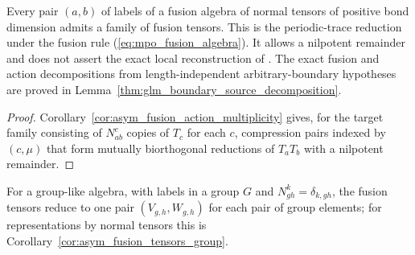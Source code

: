 \begin{theorem}%
    \label{thm:mpoalg_fusion_tensors_exist}
    \leanok
    Every pair $(a,b)$ of labels of a fusion algebra of normal tensors of
    positive bond dimension admits a family of fusion tensors. This is the
    periodic-trace reduction under the fusion rule
    (\ref{eq:mpo_fusion_algebra}). It allows a nilpotent remainder and
    does not assert the exact local reconstruction of
    \cite[Appendix~A]{GarreRubio2023MPOSym}. The exact fusion and action
    decompositions from length-independent arbitrary-boundary hypotheses
    are proved in Lemma~\ref{thm:glm_boundary_source_decomposition}.
\end{theorem}

\begin{proof}
    \leanok
    Corollary~\ref{cor:asym_fusion_action_multiplicity} gives, for the
    target family consisting of $N_{ab}^c$ copies of $T_c$ for each $c$,
    compression pairs indexed by $(c,\mu)$ that form mutually biorthogonal
    reductions of $T_aT_b$ with a nilpotent remainder.
\end{proof}

For a group-like algebra, with labels in a group $G$ and
$N_{gh}^k=\delta_{k,gh}$, the fusion tensors reduce to one pair
$(V_{g,h},W_{g,h})$ for each pair of group elements; for representations by
normal tensors this is Corollary~\ref{cor:asym_fusion_tensors_group}.

